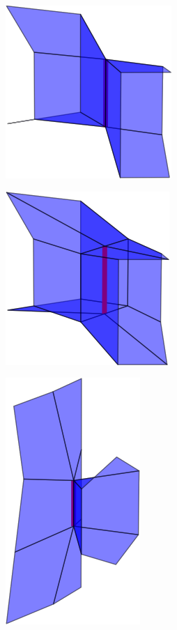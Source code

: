 \begin{figure}[p]
\begin{center}
\begin{subfigure}[b]{.45\textwidth}
\centering
\includegraphics[height = .17\textheight, width = .5\textwidth,keepaspectratio]{Pictures/SurfaceReconstruction/3DManifoldOO}
\end{subfigure}
\begin{subfigure}[b]{.45\textwidth}
\centering
\includegraphics[height = .17\textheight, width = .5\textwidth,keepaspectratio]{Pictures/SurfaceReconstruction/3DManifoldOORes}
\end{subfigure}
\begin{subfigure}[b]{.45\textwidth}
\centering
\includegraphics[height = .17\textheight, width = .5\textwidth,keepaspectratio]{Pictures/SurfaceReconstruction/3DManifoldII}

\end{subfigure}
\end{center}
\end{figure}
